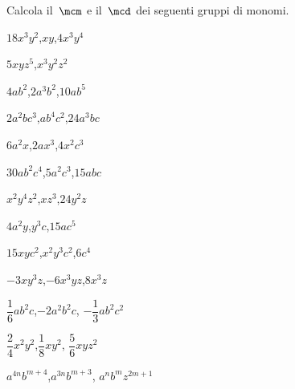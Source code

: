 \begin{esercizio}
\label{ese:9.45}
Calcola il~\(\mcm\) e il~\(\mcd\) dei seguenti gruppi di monomi.
\TabPositions{15mm, 30mm}
\begin{enumeratea}
\spazielenx
\item \(18x^{3}y^{2}\),\tab \(xy\),\tab \(4x^{3}y^{4}\) 
\item \(5xyz^{5}\),\tab \(x^{3}y^{2}z^{2}\) 
\item \(4ab^{2}\),\tab \(2a^{3}b^{2}\),\tab \(10ab^{5}\) 
\item \(2a^{2}bc^{3}\),\tab \(ab^{4}c^{2}\),\tab \(24a^{3}bc\)
\item \(6a^{2}x\),\tab \(2ax^{3}\),\tab \(4x^{2}c^{3}\)
\item \(30ab^{2}c^{4}\),\tab \(5a^{2}c^{3}\),\tab \(15abc\)
\item \(x^{2}y^{4}z^{2}\),\tab \(xz^{3}\),\tab \(24y^{2}z\)
\item \(4a^{2}y\),\tab \(y^{3}c\),\tab \(15ac^{5}\)
\item \(15xyc^{2}\),\tab \(x^{2}y^{3}c^{2}\),\tab \(6c^{4}\)
% 
% 
\item \(-3xy^{3}z\),\tab \(-6x^{3}yz\),\tab \(8x^{3}z\) 
\item \(\dfrac{1}{6}ab^{2}c\),\tab \(-2a^{2}b^{2}c\),\tab 
\(-{\dfrac{1}{3}}ab^{2}c^{2}\) 
\item \(\dfrac{2}{4}x^{2}y^{2}\),\tab \(\dfrac{1}{8}xy^{2}\),\tab 
\(\dfrac{5}{6}xyz^{2}\) 
\item \(a^{4n}b^{m+4}\),\tab \(a^{3n}b^{m+3}\),\tab 
\(a^{n}b^{m}z^{2m+1}\)
\end{enumeratea}
\end{esercizio}

